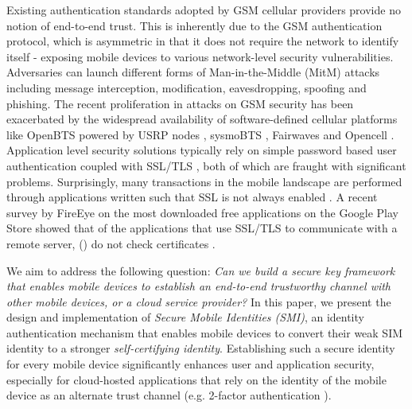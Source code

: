 \documentclass[letterpaper,twocolumn]{sig-alternate}
\begin{document}
Existing authentication standards adopted by GSM cellular providers provide no notion of end-to-end trust. This is inherently due to the GSM authentication protocol, which is asymmetric in that it does not require the network to identify itself - exposing mobile devices to various network-level security vulnerabilities. Adversaries can launch different forms of Man-in-the-Middle (MitM) attacks \cite{securityVul} including message interception, modification, eavesdropping, spoofing and phishing. The recent proliferation in attacks on GSM security \cite{praattack,germany,comp128} has been exacerbated by the widespread availability of software-defined cellular platforms like OpenBTS \cite{openbts} powered by USRP nodes \cite{usrp}, sysmoBTS \cite{sysmobts}, Fairwaves \cite{fairwaves} and Opencell \cite{opencell}.  Application level security solutions typically rely on simple password based user authentication coupled with SSL/TLS \cite{ssltls}, both of which are fraught with significant problems. Surprisingly, many transactions in the mobile landscape are performed through applications written such that SSL is not always enabled \cite{schrittwieser2012guess}. A recent survey by FireEye on the  most downloaded free applications on the Google Play Store showed that of the  applications that use SSL/TLS to communicate with a remote server,  () do not check certificates \cite{fireeye}.

We aim to address the following question: {\em Can we build a secure key framework that enables mobile devices to establish an end-to-end trustworthy channel with other mobile devices, or a cloud service provider?} In this paper, we present the design and implementation of {\em Secure Mobile Identities (SMI)}, an identity authentication mechanism that enables mobile devices to convert their weak SIM identity to a stronger {\em self-certifying identity}. Establishing such a secure identity for every mobile device significantly enhances user and application security, especially for cloud-hosted applications that rely on the identity of the mobile device as an alternate trust channel (e.g. 2-factor authentication \cite{2fauth,schneier2005two}). 
\end{document}

